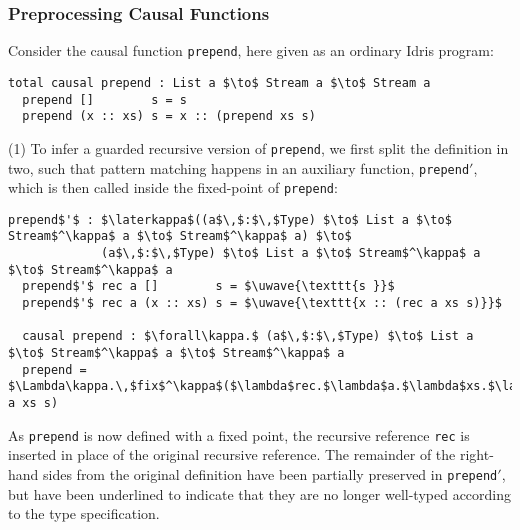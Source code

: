 \subsubsection{Preprocessing Causal Functions}
 Consider the causal function \texttt{prepend}, here
given as an ordinary Idris program:
\begin{lstlisting}[mathescape]
  total causal prepend : List a $\to$ Stream a $\to$ Stream a
  prepend []        s = s
  prepend (x :: xs) s = x :: (prepend xs s)
\end{lstlisting}
(1) To infer a guarded recursive version of \texttt{prepend}, we first split the
definition in two, such that pattern matching happens in an auxiliary function,
\texttt{prepend$'$}, which is then called inside the fixed-point of \texttt{prepend}:

\begin{lstlisting}[mathescape]
  prepend$'$ : $\laterkappa$((a$\,$:$\,$Type) $\to$ List a $\to$ Stream$^\kappa$ a $\to$ Stream$^\kappa$ a) $\to$ 
             (a$\,$:$\,$Type) $\to$ List a $\to$ Stream$^\kappa$ a $\to$ Stream$^\kappa$ a
  prepend$'$ rec a []        s = $\uwave{\texttt{s }}$
  prepend$'$ rec a (x :: xs) s = $\uwave{\texttt{x :: (rec a xs s)}}$

  causal prepend : $\forall\kappa.$ (a$\,$:$\,$Type) $\to$ List a $\to$ Stream$^\kappa$ a $\to$ Stream$^\kappa$ a
  prepend = $\Lambda\kappa.\,$fix$^\kappa$($\lambda$rec.$\lambda$a.$\lambda$xs.$\lambda$s.$\,$prepend$'\;$rec a xs s)
\end{lstlisting}
As \texttt{prepend} is now defined with a fixed point, the recursive reference
\texttt{rec} is inserted in place of the original recursive reference. The
remainder of the right-hand sides from the original definition have been partially preserved
in \texttt{prepend$'$}, but have been underlined to indicate that they are no
longer well-typed according to the type specification.

